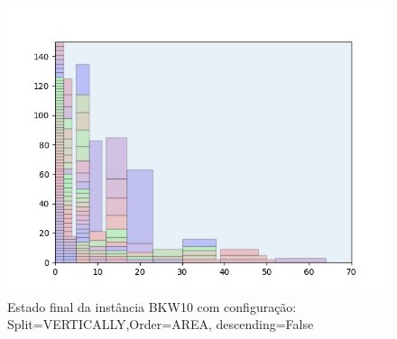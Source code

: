 \begin{figure}[H]
    \centering
    \caption[]{Estado final da instância BKW10 com configuração: Split=VERTICALLY,Order=AREA, descending=False}
    \label{fig:bkw10-vertically-area-false}
    \includegraphics[scale=0.5]{output/figures/bkw/bkw10/vertically/area/false/000}
\end{figure}